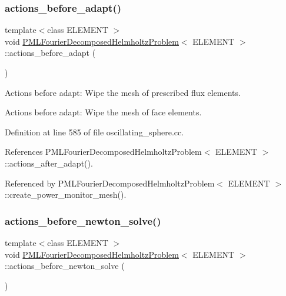 \subsubsection{\texorpdfstring{actions\+\_\+before\+\_\+adapt()}{actions\_before\_adapt()}}
{\footnotesize\ttfamily template$<$class E\+L\+E\+M\+E\+NT $>$ \\
void \hyperlink{classPMLFourierDecomposedHelmholtzProblem}{P\+M\+L\+Fourier\+Decomposed\+Helmholtz\+Problem}$<$ E\+L\+E\+M\+E\+NT $>$\+::actions\+\_\+before\+\_\+adapt (\begin{DoxyParamCaption}{ }\end{DoxyParamCaption})}



Actions before adapt\+: Wipe the mesh of prescribed flux elements. 

Actions before adapt\+: Wipe the mesh of face elements. 

Definition at line 585 of file oscillating\+\_\+sphere.\+cc.



References P\+M\+L\+Fourier\+Decomposed\+Helmholtz\+Problem$<$ E\+L\+E\+M\+E\+N\+T $>$\+::actions\+\_\+after\+\_\+adapt().



Referenced by P\+M\+L\+Fourier\+Decomposed\+Helmholtz\+Problem$<$ E\+L\+E\+M\+E\+N\+T $>$\+::create\+\_\+power\+\_\+monitor\+\_\+mesh().

\mbox{\label{classPMLFourierDecomposedHelmholtzProblem_af87810cbe164981cc14ee779793a69fb}} 
\subsubsection{\texorpdfstring{actions\+\_\+before\+\_\+newton\+\_\+solve()}{actions\_before\_newton\_solve()}}
{\footnotesize\ttfamily template$<$class E\+L\+E\+M\+E\+NT $>$ \\
void \hyperlink{classPMLFourierDecomposedHelmholtzProblem}{P\+M\+L\+Fourier\+Decomposed\+Helmholtz\+Problem}$<$ E\+L\+E\+M\+E\+NT $>$\+::actions\+\_\+before\+\_\+newton\+\_\+solve (\begin{DoxyParamCaption}{ }\end{DoxyParamCaption})\hspace{0.3cm}{\ttfamily [inline]}}



